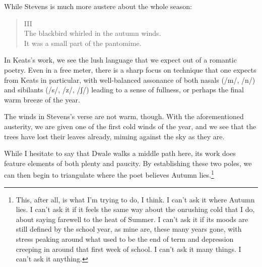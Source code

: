 \documentclass[12pt]{memoir}
\begin{document}
While Stevens is much more austere about the whole season:

\begin{verse}
III \\
The blackbird whirled in the autumn winds. \\
It was a small part of the pantomime.

\parencite{blackbird}
\end{verse}

In Keats's work, we see the lush language that we expect out of a romantic poetry. Even in a free meter, there is a sharp focus on technique that one expects from Keats in particular, with well-balanced assonance of both nasals (/{\IPAfont m}/, /{\IPAfont n}/) and sibilants (/{\IPAfont s}/, /{\IPAfont z}/, /{\IPAfont ʃ}/) leading to a sense of fullness, or perhaps the final warm breeze of the year.

The winds in Stevens's verse are not warm, though. With the aforementioned austerity, we are given one of the first cold winds of the year, and we see that the trees have lost their leaves already, miming against the sky as they are.

While I hesitate to say that Dwale walks a middle path here, its work does feature elements of both plenty and paucity. By establishing these two poles, we can then begin to triangulate where the poet believes Autumn lies.\footnote{This, after all, is what I'm trying to do, I think. I can't ask it where Autumn lies. I can't ask it if it feels the same way about the onrushing cold that I do, about saying farewell to the heat of Summer. I can't ask it if its moods are still defined by the school year, as mine are, these many years gone, with stress peaking around what used to be the end of term and depression creeping in around that first week of school. I can't ask it many things. I can't ask it anything.}
\end{document}
